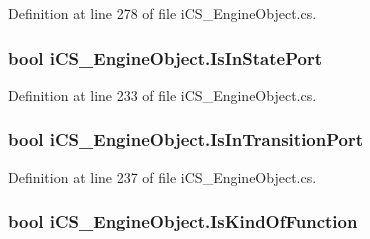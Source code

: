 Definition at line 278 of file i\+C\+S\+\_\+\+Engine\+Object.\+cs.

\hypertarget{classi_c_s___engine_object_a8e8f5f2987ec22b8cede2106a3d58a13}{
\subsubsection[{Is\+In\+State\+Port}]{\setlength{\rightskip}{0pt plus 5cm}bool i\+C\+S\+\_\+\+Engine\+Object.\+Is\+In\+State\+Port\hspace{0.3cm}{\ttfamily [get]}}}\label{classi_c_s___engine_object_a8e8f5f2987ec22b8cede2106a3d58a13}


Definition at line 233 of file i\+C\+S\+\_\+\+Engine\+Object.\+cs.

\hypertarget{classi_c_s___engine_object_a9e55522ec4160595fd6879fd09c9df0b}{
\subsubsection[{Is\+In\+Transition\+Port}]{\setlength{\rightskip}{0pt plus 5cm}bool i\+C\+S\+\_\+\+Engine\+Object.\+Is\+In\+Transition\+Port\hspace{0.3cm}{\ttfamily [get]}}}\label{classi_c_s___engine_object_a9e55522ec4160595fd6879fd09c9df0b}


Definition at line 237 of file i\+C\+S\+\_\+\+Engine\+Object.\+cs.

\hypertarget{classi_c_s___engine_object_a57fda1055fc2a77e436614d8035179fd}{
\subsubsection[{Is\+Kind\+Of\+Function}]{\setlength{\rightskip}{0pt plus 5cm}bool i\+C\+S\+\_\+\+Engine\+Object.\+Is\+Kind\+Of\+Function\hspace{0.3cm}{\ttfamily [get]}}}\label{classi_c_s___engine_object_a57fda1055fc2a77e436614d8035179fd}


